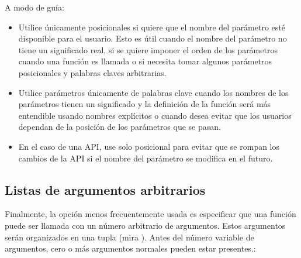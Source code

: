\documentclass[a5paper,10pt,spanish]{sphinxmanual}
\begin{document}
\sphinxAtStartPar
A modo de guía:
\begin{itemize}
\item {} 
\sphinxAtStartPar
Utilice únicamente posicionales si quiere que el nombre del parámetro esté disponible para el usuario. Esto es útil cuando el nombre del parámetro no tiene un significado real, si se quiere imponer el orden de los parámetros cuando una función es llamada o si necesita tomar algunos parámetros posicionales y palabras claves arbitrarias.

\item {} 
\sphinxAtStartPar
Utilice parámetros únicamente de palabras clave cuando los nombres de los parámetros tienen un significado y la definición de la función será más entendible usando nombres explícitos o cuando desea evitar que los usuarios dependan de la posición de los parámetros que se pasan.

\item {} 
\sphinxAtStartPar
En el caso de una API, use solo posicional para evitar que se rompan los cambios de la API si el nombre del parámetro se modifica en el futuro.

\end{itemize}


\subsection{Listas de argumentos arbitrarios}
\label{\detokenize{tutorial/controlflow:arbitrary-argument-lists}}\label{\detokenize{tutorial/controlflow:tut-arbitraryargs}}
\ignorespaces 
\sphinxAtStartPar
Finalmente, la opción menos frecuentemente usada es especificar que una función puede ser llamada con un número arbitrario de argumentos. Estos argumentos serán organizados en una tupla (mira {\hyperref[\detokenize{tutorial/datastructures:tut-tuples}]{}}). Antes del número variable de argumentos, cero o más argumentos normales pueden estar presentes.:

\begin{sphinxVerbatim}[commandchars=\\\{\}]
   
\end{sphinxVerbatim}
\end{document}
